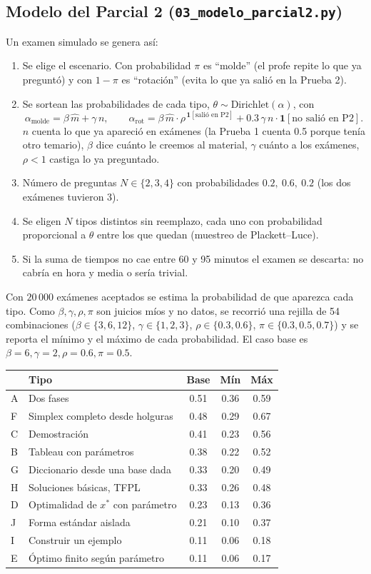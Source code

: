 \documentclass[11pt]{article}
\newcommand{\cod}[1]{\texttt{#1}}
\begin{document}
\subsection{Modelo del Parcial 2 (\cod{03\_modelo\_parcial2.py})}
Un examen simulado se genera así:
\begin{enumerate}
\item Se elige el escenario. Con probabilidad $\pi$ es ``molde'' (el profe repite lo que ya
preguntó) y con $1-\pi$ es ``rotación'' (evita lo que ya salió en la Prueba 2).
\item Se sortean las probabilidades de cada tipo, $\theta \sim \text{Dirichlet}(\alpha)$, con
\[
\alpha_{\text{molde}} = \beta\,\hat m + \gamma\, n, \qquad
\alpha_{\text{rot}} = \beta\,\hat m \cdot \rho^{\,\mathbf 1[\text{salió en P2}]} + 0.3\,\gamma\, n\cdot\mathbf 1[\text{no salió en P2}].
\]
$n$ cuenta lo que ya apareció en exámenes (la Prueba 1 cuenta 0.5 porque tenía otro temario),
$\beta$ dice cuánto le creemos al material, $\gamma$ cuánto a los exámenes, $\rho<1$ castiga
lo ya preguntado.
\item Número de preguntas $N\in\{2,3,4\}$ con probabilidades $0.2,\ 0.6,\ 0.2$ (los dos
exámenes tuvieron 3).
\item Se eligen $N$ tipos distintos sin reemplazo, cada uno con probabilidad proporcional a
$\theta$ entre los que quedan (muestreo de Plackett--Luce).
\item Si la suma de tiempos no cae entre 60 y 95 minutos el examen se descarta: no cabría en
hora y media o sería trivial.
\end{enumerate}
Con $20\,000$ exámenes aceptados se estima la probabilidad de que aparezca cada tipo. Como
$\beta,\gamma,\rho,\pi$ son juicios míos y no datos, se recorrió una rejilla de 54
combinaciones ($\beta\in\{3,6,12\}$, $\gamma\in\{1,2,3\}$, $\rho\in\{0.3,0.6\}$,
$\pi\in\{0.3,0.5,0.7\}$) y se reporta el mínimo y el máximo de cada probabilidad. El caso base
es $\beta=6,\gamma=2,\rho=0.6,\pi=0.5$.

\begin{center}
\small
\begin{tabular}{llccc}
\toprule
& Tipo & Base & Mín & Máx \\
\midrule
A & Dos fases & 0.51 & 0.36 & 0.59 \\
F & Simplex completo desde holguras & 0.48 & 0.29 & 0.67 \\
C & Demostración & 0.41 & 0.23 & 0.56 \\
B & Tableau con parámetros & 0.38 & 0.22 & 0.52 \\
G & Diccionario desde una base dada & 0.33 & 0.20 & 0.49 \\
H & Soluciones básicas, TFPL & 0.33 & 0.26 & 0.48 \\
D & Optimalidad de $x^*$ con parámetro & 0.23 & 0.13 & 0.36 \\
J & Forma estándar aislada & 0.21 & 0.10 & 0.37 \\
I & Construir un ejemplo & 0.11 & 0.06 & 0.18 \\
E & Óptimo finito según parámetro & 0.11 & 0.06 & 0.17 \\
\bottomrule
\end{tabular}
\end{center}
\end{document}
